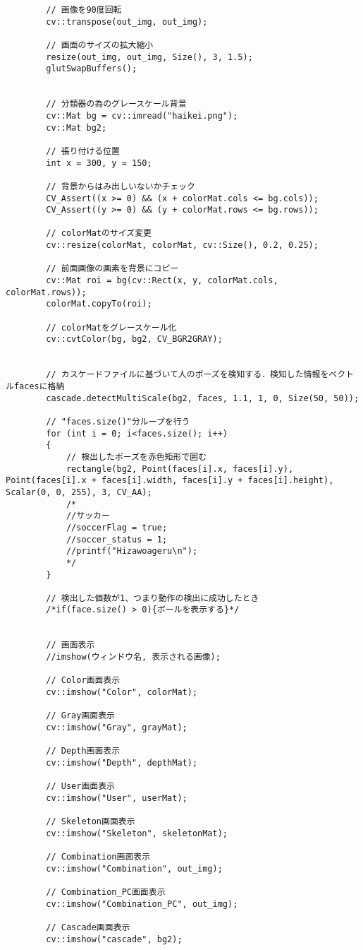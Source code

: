 \begin{lstlisting}
		// 画像を90度回転
		cv::transpose(out_img, out_img);

		// 画面のサイズの拡大縮小
		resize(out_img, out_img, Size(), 3, 1.5); 
		glutSwapBuffers();


		// 分類器の為のグレースケール背景
		cv::Mat bg = cv::imread("haikei.png");
		cv::Mat bg2;

		// 張り付ける位置
		int x = 300, y = 150;
		
		// 背景からはみ出しいないかチェック
		CV_Assert((x >= 0) && (x + colorMat.cols <= bg.cols));
		CV_Assert((y >= 0) && (y + colorMat.rows <= bg.rows));
		
		// colorMatのサイズ変更
		cv::resize(colorMat, colorMat, cv::Size(), 0.2, 0.25);
		
		// 前面画像の画素を背景にコピー
		cv::Mat roi = bg(cv::Rect(x, y, colorMat.cols, colorMat.rows));
		colorMat.copyTo(roi);
		
		// colorMatをグレースケール化
		cv::cvtColor(bg, bg2, CV_BGR2GRAY);


		// カスケードファイルに基づいて人のポーズを検知する．検知した情報をベクトルfacesに格納
		cascade.detectMultiScale(bg2, faces, 1.1, 1, 0, Size(50, 50));

		// "faces.size()"分ループを行う
		for (int i = 0; i<faces.size(); i++)
		{
			// 検出したポーズを赤色矩形で囲む
			rectangle(bg2, Point(faces[i].x, faces[i].y), Point(faces[i].x + faces[i].width, faces[i].y + faces[i].height), Scalar(0, 0, 255), 3, CV_AA); 
			/*
			//サッカー
			//soccerFlag = true;
			//soccer_status = 1;
			//printf("Hizawoageru\n");
			*/
		}
		
		// 検出した個数が1、つまり動作の検出に成功したとき
		/*if(face.size() > 0){ボールを表示する}*/


		// 画面表示 
		//imshow(ウィンドウ名, 表示される画像);

		// Color画面表示
		cv::imshow("Color", colorMat);
		
		// Gray画面表示
		cv::imshow("Gray", grayMat);
		
		// Depth画面表示
		cv::imshow("Depth", depthMat);
		
		// User画面表示
		cv::imshow("User", userMat);
		
		// Skeleton画面表示
		cv::imshow("Skeleton", skeletonMat);
		
		// Combination画面表示
		cv::imshow("Combination", out_img);
		
		// Combination_PC画面表示
		cv::imshow("Combination_PC", out_img);
		
		// Cascade画面表示
		cv::imshow("cascade", bg2);
		

\end{lstlisting}
